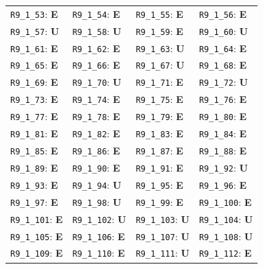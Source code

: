 \begin{longtable}{llll}
\texttt{R9\_1\_53}: \textbf{E} & \texttt{R9\_1\_54}: \textbf{E} & \texttt{R9\_1\_55}: \textbf{E} & \texttt{R9\_1\_56}: \textbf{E} \\
\texttt{R9\_1\_57}: \textbf{U} & \texttt{R9\_1\_58}: \textbf{U} & \texttt{R9\_1\_59}: \textbf{E} & \texttt{R9\_1\_60}: \textbf{U} \\
\texttt{R9\_1\_61}: \textbf{E} & \texttt{R9\_1\_62}: \textbf{E} & \texttt{R9\_1\_63}: \textbf{U} & \texttt{R9\_1\_64}: \textbf{E} \\
\texttt{R9\_1\_65}: \textbf{E} & \texttt{R9\_1\_66}: \textbf{E} & \texttt{R9\_1\_67}: \textbf{U} & \texttt{R9\_1\_68}: \textbf{E} \\
\texttt{R9\_1\_69}: \textbf{E} & \texttt{R9\_1\_70}: \textbf{U} & \texttt{R9\_1\_71}: \textbf{E} & \texttt{R9\_1\_72}: \textbf{U} \\
\texttt{R9\_1\_73}: \textbf{E} & \texttt{R9\_1\_74}: \textbf{E} & \texttt{R9\_1\_75}: \textbf{E} & \texttt{R9\_1\_76}: \textbf{E} \\
\texttt{R9\_1\_77}: \textbf{E} & \texttt{R9\_1\_78}: \textbf{E} & \texttt{R9\_1\_79}: \textbf{E} & \texttt{R9\_1\_80}: \textbf{E} \\
\texttt{R9\_1\_81}: \textbf{E} & \texttt{R9\_1\_82}: \textbf{E} & \texttt{R9\_1\_83}: \textbf{E} & \texttt{R9\_1\_84}: \textbf{E} \\
\texttt{R9\_1\_85}: \textbf{E} & \texttt{R9\_1\_86}: \textbf{E} & \texttt{R9\_1\_87}: \textbf{E} & \texttt{R9\_1\_88}: \textbf{E} \\
\texttt{R9\_1\_89}: \textbf{E} & \texttt{R9\_1\_90}: \textbf{E} & \texttt{R9\_1\_91}: \textbf{E} & \texttt{R9\_1\_92}: \textbf{U} \\
\texttt{R9\_1\_93}: \textbf{E} & \texttt{R9\_1\_94}: \textbf{U} & \texttt{R9\_1\_95}: \textbf{E} & \texttt{R9\_1\_96}: \textbf{E} \\
\texttt{R9\_1\_97}: \textbf{E} & \texttt{R9\_1\_98}: \textbf{U} & \texttt{R9\_1\_99}: \textbf{E} & \texttt{R9\_1\_100}: \textbf{E} \\
\texttt{R9\_1\_101}: \textbf{E} & \texttt{R9\_1\_102}: \textbf{U} & \texttt{R9\_1\_103}: \textbf{U} & \texttt{R9\_1\_104}: \textbf{U} \\
\texttt{R9\_1\_105}: \textbf{E} & \texttt{R9\_1\_106}: \textbf{E} & \texttt{R9\_1\_107}: \textbf{U} & \texttt{R9\_1\_108}: \textbf{U} \\
\texttt{R9\_1\_109}: \textbf{E} & \texttt{R9\_1\_110}: \textbf{E} & \texttt{R9\_1\_111}: \textbf{U} & \texttt{R9\_1\_112}: \textbf{E} \\

\end{longtable}
